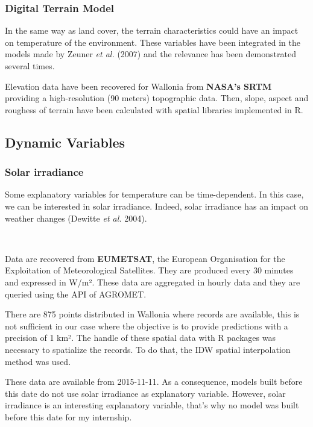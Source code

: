 \documentclass[12pt,twoside]{reedthesis}
\theoremstyle{definition}
\theoremstyle{definition}
\theoremstyle{definition}
\theoremstyle{remark}
\begin{document}
\subsubsection{Digital Terrain Model}\label{digital-terrain-model}

In the same way as land cover, the terrain characteristics could have an
impact on temperature of the environment. These variables have been
integrated in the models made by Zeuner \emph{et al.} (2007) and the
relevance has been demonstrated several times.

Elevation data have been recovered for Wallonia from \textbf{NASA's
SRTM} providing a high-resolution (90 meters) topographic data. Then,
slope, aspect and roughess of terrain have been calculated with spatial
libraries implemented in R.

\subsection{Dynamic Variables}\label{dynamic-variables}

\subsubsection{Solar irradiance}\label{solar-irradiance}

Some explanatory variables for temperature can be time-dependent. In
this case, we can be interested in solar irradiance. Indeed, solar
irradiance has an impact on weather changes (Dewitte \emph{et al.}
2004).

~

Data are recovered from \textbf{EUMETSAT}, the European Organisation for
the Exploitation of Meteorological Satellites. They are produced every
30 minutes and expressed in W/m². These data are aggregated in hourly
data and they are queried using the API of AGROMET.

There are 875 points distributed in Wallonia where records are
available, this is not sufficient in our case where the objective is to
provide predictions with a precision of 1 km². The handle of these
spatial data with R packages was necessary to spatialize the records. To
do that, the IDW spatial interpolation method was used.

These data are available from 2015-11-11. As a consequence, models built
before this date do not use solar irradiance as explanatory variable.
However, solar irradiance is an interesting explanatory variable, that's
why no model was built before this date for my internship.
\end{document}
